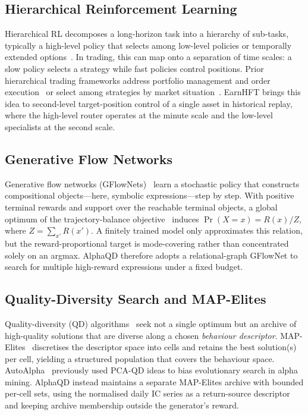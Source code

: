 \subsection{Hierarchical Reinforcement Learning}
\label{sec:bg_hrl}

Hierarchical RL decomposes a long-horizon task into a hierarchy of sub-tasks, typically a high-level policy that selects among low-level policies or temporally extended options~\cite{sutton1999between,pateria2021hierarchical}. In trading, this can map onto a separation of time scales: a slow policy selects a strategy while fast policies control positions. Prior hierarchical trading frameworks address portfolio management and order execution~\cite{wang2021commission} or select among strategies by market situation~\cite{niu2022metatrader}. EarnHFT brings this idea to second-level target-position control of a single asset in historical replay, where the high-level router operates at the minute scale and the low-level specialists at the second scale.

\subsection{Generative Flow Networks}
\label{sec:bg_gflownet}

Generative flow networks (GFlowNets)~\cite{bengio2021gflownet} learn a stochastic policy that constructs compositional objects---here, symbolic expressions---step by step. With positive terminal rewards and support over the reachable terminal objects, a global optimum of the trajectory-balance objective~\cite{malkin2022trajectorybalance} induces $\Pr(X=x)=R(x)/Z$, where $Z=\sum_{x'}R(x')$. A finitely trained model only approximates this relation, but the reward-proportional target is mode-covering rather than concentrated solely on an argmax. AlphaQD therefore adopts a relational-graph GFlowNet to search for multiple high-reward expressions under a fixed budget.

\subsection{Quality-Diversity Search and MAP-Elites}
\label{sec:bg_qd}

Quality-diversity (QD) algorithms~\cite{pugh2016quality} seek not a single optimum but an archive of high-quality solutions that are diverse along a chosen \emph{behaviour descriptor}. MAP-Elites~\cite{mouret2015mapelites} discretises the descriptor space into cells and retains the best solution(s) per cell, yielding a structured population that covers the behaviour space. AutoAlpha~\cite{zhang2020autoalpha} previously used PCA-QD ideas to bias evolutionary search in alpha mining. AlphaQD instead maintains a separate MAP-Elites archive with bounded per-cell sets, using the normalised daily IC series as a return-source descriptor and keeping archive membership outside the generator's reward.

